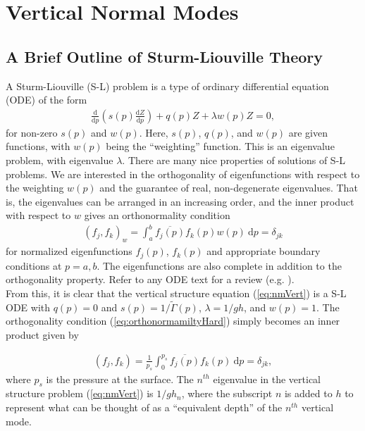\section{Vertical Normal Modes}
\subsection{A Brief Outline of Sturm-Liouville Theory}
A Sturm-Liouville (S-L) problem is a type of ordinary differential equation (ODE) of the form
\begin{align}
\frac{\text{d}}{\text{d} p} \left( s(p) \frac{\text{d} Z}{\text{d} p} \right) + q(p) Z + \lambda w(p) Z = 0, \label{eq:SturmLiouville}
\end{align}
for non-zero $s(p)$ and $w(p)$. Here, $s(p)$, $q(p)$, and $w(p)$ are given functions, with $w(p)$ being the ``weighting'' function. This is an eigenvalue problem, with eigenvalue $\lambda$. There are many nice properties of solutions of S-L problems. We are interested in the orthogonality of eigenfunctions with respect to the weighting $w(p)$ and the guarantee of real, non-degenerate eigenvalues. That is, the eigenvalues can be arranged in an increasing order, and the inner product with respect to $w$ gives an orthonormality condition 
\begin{align}
(f_j, f_k)_w = \int_a^b \overline{f_j(p)}f_k(p) w(p) ~\text{d}p = \delta_{jk} \label{eq:orthonormamiltyHard}
\end{align}
for normalized eigenfunctions $f_j(p)$, $f_k(p)$ and appropriate boundary conditions at $p=a,b$. The eigenfunctions are also complete in addition to the orthogonality property. Refer to any ODE text for a review (e.g. \cite{Atkinson1964}).\\

From this, it is clear that the vertical structure equation (\ref{eq:nmVert}) is a S-L ODE with $q(p) = 0$ and $s(p) = 1/\tilde{\Gamma}(p)$, $\lambda = 1/gh$, and $w(p) = 1$. The orthogonality condition (\ref{eq:orthonormamiltyHard}) simply becomes an inner product given by

\begin{align}
(f_j, f_k) = \frac{1}{p_s} \int_0^{p_s} \overline{f_j(p)} f_k(p) ~\text{d}p = \delta_{jk},
\end{align}
where $p_s$ is the pressure at the surface. The $n^{th}$ eigenvalue in the vertical structure problem (\ref{eq:nmVert}) is $1/gh_n$, where the subscript $n$ is added to $h$ to represent what can be thought of as a ``equivalent depth'' \cite{Daley1991} of the $n^{th}$ vertical mode.\\

